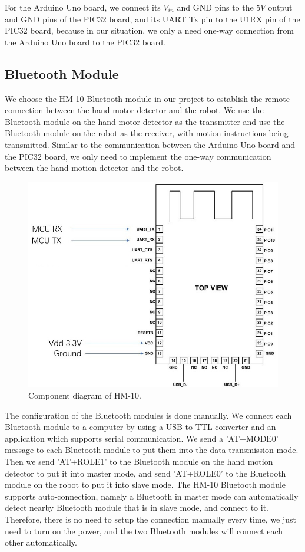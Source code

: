 \documentclass[a4paper]{article}
\begin{document}
For the Arduino Uno board, we connect its $V_{in}$ and GND pins to the $5V$ output and GND pins of the PIC32 board, and its UART Tx pin to the U1RX pin of the PIC32 board, because in our situation, we only a need one-way connection from the Arduino Uno board to the PIC32 board.

\subsection{Bluetooth Module}
We choose the HM-10 Bluetooth module in our project to establish the remote connection between the hand motor detector and the robot. We use the Bluetooth module on the hand motor detector as the transmitter and use the Bluetooth module on the robot as the receiver, with motion instructions being transmitted. Similar to the communication between the Arduino Uno board and the PIC32 board, we only need to implement the one-way communication between the hand motion detector and the robot.

\begin{figure}[H]
    \centering
    \includegraphics[width=1\textwidth]{HM10.jpg}
    \caption{Component diagram of HM-10.}
\end{figure}

The configuration of the Bluetooth modules is done manually. We connect each Bluetooth module to a computer by using a USB to TTL converter and an application which supports serial communication. We send a 'AT+MODE0' message to each Bluetooth module to put them into the data transmission mode. Then we send 'AT+ROLE1' to the Bluetooth module on the hand motion detector to put it into master mode, and send 'AT+ROLE0' to the Bluetooth module on the robot to put it into slave mode. The HM-10 Bluetooth module supports auto-connection, namely a Bluetooth in master mode can automatically detect nearby Bluetooth module that is in slave mode, and connect to it. Therefore, there is no need to setup the connection manually every time, we just need to turn on the power, and the two Bluetooth modules will connect each other automatically.
\end{document}
